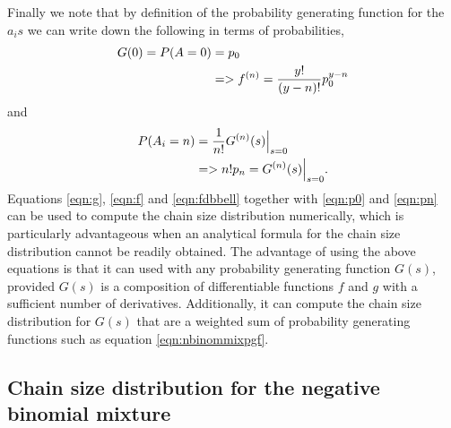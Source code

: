 \documentclass{imammb}
\numberwithin{equation}{section}
\begin{document}
Finally we note that by definition of the probability generating function for the $a_is$ we can write down the following in terms of probabilities,
\begin{align}\label{eqn:p0}
   G(0) =  P(A=0) &= p_0 \notag \\
    &=> f^{(n)}= \frac{y!}{(y-n)!} p_0^{y-n} 
\end{align}
and
\begin{align}\label{eqn:pn}
    P(A_i=n) &= \frac{1}{n!} G^{(n)}(s)\Bigr|_{s=0} \notag \\
    &=> n! p_n = G^{(n)}(s)\Bigr|_{s=0}.
\end{align}
Equations \eqref{eqn:g}, \eqref{eqn:f} and \eqref{eqn:fdbbell} together with \eqref{eqn:p0} and \eqref{eqn:pn} can be used to compute the chain size distribution numerically, which is particularly advantageous when an analytical formula for the chain size distribution cannot be readily obtained. The advantage of using the above equations is that it can used with any probability generating function $G(s)$, provided $G(s)$ is a composition of differentiable functions $f$ and $g$ with a sufficient number of derivatives. Additionally, it can compute the chain size distribution for $G(s)$ that are a weighted sum of probability generating functions such as equation \eqref{eqn:nbinommixpgf}. 

\subsection{Chain size distribution for the negative binomial mixture}
\end{document}
